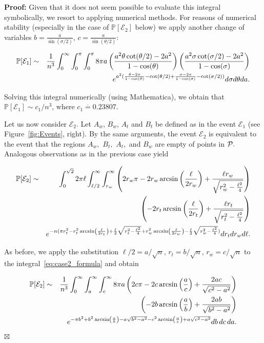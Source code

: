 \documentclass {journal}
\newenvironment {proof}{\textbf {Proof:}}{\hfill \ensuremath {\boxtimes}}
\newcommand{\Pts}{\cal P}
\newcommand{\bP}{{\mathbb P}}
\begin{document}
\begin{proof}
Given that it does not seem possible to evaluate this integral
symbolically, we resort to applying numerical methods. For reasons
of numerical stability (especially in the case of
$\bP[\mathcal{E}_2]$ below) we apply another change of variables
$b=\frac{a}{\sin(\sigma/2)}$, $c=\frac{a}{\sin(\theta/2)}$:

\begin{eqnarray*}\label{eq:case1_3}
 \bP[\mathcal{E}_1]&\sim&\frac{1}{n^3}
\int_0^{\infty} \int_{0}^{\pi} \int_{0}^{\pi} 8 \pi a \left(
\frac{a^2 \theta \cot(\theta/2)-2a^2}{1-\cos(\theta)} \right)
\left( \frac{a^2 \sigma \cot(\sigma/2)-2a^2}{1-\cos(\sigma)}
\right)
 \notag\\
&& e^{a^2(\frac{\theta-2\pi}{1-\cos(\theta)} - \cot(\theta/2)+
\frac{\sigma-2\pi}{1-\cos(\sigma)} - \cot(\sigma/2))} d\sigma
d\theta da.
\end{eqnarray*}

Solving this integral numerically (using Mathematica), we obtain
that $\bP[\mathcal{E}_1]\sim c_1/n^3$, where $c_1
\stackrel{\cdot}{=} 0.23807$.

Let us now consider $\mathcal{E}_2.$ Let $A_w$, $B_w$, $A_t$ and
$B_t$ be defined as in the event $\mathcal{E}_1$ (see
Figure~\ref{fig:Events}, right). By the same arguments, the event
$\mathcal{E}_2$ is equivalent to the event that the regions $A_w,$
$B_t,$ $A_t,$ and $B_w$ are empty of points in $\Pts.$ Analogous
observations as in the previous case yield

\begin{eqnarray}\label{eq:case2_formula}
 \bP[\mathcal{E}_2]&\sim&
\int_0^{\sqrt{2}} 2\pi \ell
\int_{\ell/2}^{\infty}\int_{r_w}^{\infty}
\left(2r_w \pi -2r_w \arcsin\left(\frac{\ell}{2r_w}\right)+\frac{\ell r_w}{\sqrt{r_w^2 - \frac{\ell^2}{4}}} \right) \notag\\
&& \left(-2r_t \arcsin\left(\frac{\ell}{2r_t}\right)+\frac{\ell r_t}{\sqrt{r_t^2 - \frac{\ell^2}{4}}} \right) \notag\\
&& e^{-n(\pi r_t^2 - r_t^2
\arcsin\left(\frac{\ell}{2r_t}\right)+\frac{\ell}{2}\sqrt{r_t^2-\frac{\ell^2}{4}}+r_w^2
\arcsin\left(\frac{\ell}{2r_w}\right)-\frac{\ell}{2}\sqrt{r_w^2-\frac{\ell^2}{4}}
)} dr_t dr_w d\ell.
\end{eqnarray}

As before, we apply the substitution $\ell/2= a/\sqrt n$,
$r_t=b/\sqrt n$, $r_w = c/\sqrt n$ to the
integral~\eqref{eq:case2_formula} and obtain

\begin{eqnarray*}\label{eq:case2_2}
  \bP[\mathcal{E}_2]&\sim&\frac{1}{n^3}
\int_0^{\infty} \int_{a}^{\infty} \int_{c}^{\infty} 8 \pi a
 \left(2c\pi-2c \arcsin\left(\frac{a}{c}\right)+\frac{2 ac}{\sqrt{c^2-a^2}} \right)  \notag\\
&& \left(-2b \arcsin\left(\frac{a}{b}\right)+\frac{2 ab}{\sqrt{b^2-a^2}} \right) \notag\\
&& e^{-\pi b^2 + b^2\arcsin\left(\frac{a}{b}\right) -a
\sqrt{b^2-a^2}-c^2 \arcsin\left(\frac{a}{c}\right)+a
\sqrt{c^2-a^2} } db\,dc\,da.
\end{eqnarray*}


\end{proof}
\end{document}
